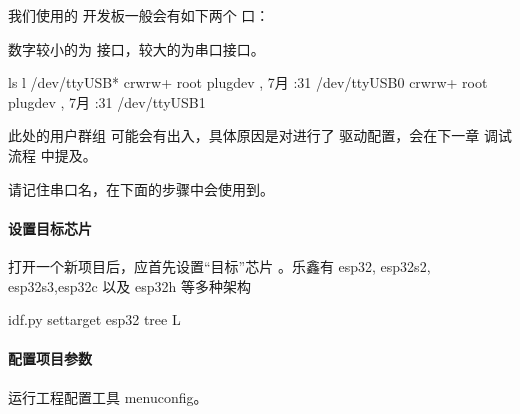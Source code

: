 \documentclass[a4paper,12pt,english]{sphinxmanual}
\begin{document}
\sphinxAtStartPar
我们使用的 开发板一般会有如下两个  口：

\sphinxAtStartPar
数字较小的为 接口，较大的为串口接口。

\begin{sphinxVerbatim}[commandchars=\\\{\}]
ls \PYGZhy{}l /dev/ttyUSB*
crw\PYGZhy{}rw\PYGZhy{}\PYGZhy{}\PYGZhy{}\PYGZhy{}+  root plugdev ,  7月   :31 /dev/ttyUSB0
crw\PYGZhy{}rw\PYGZhy{}\PYGZhy{}\PYGZhy{}\PYGZhy{}+  root plugdev ,  7月   :31 /dev/ttyUSB1
\end{sphinxVerbatim}

\sphinxAtStartPar
此处的用户群组 可能会有出入，具体原因是对进行了 驱动配置，会在下一章 调试流程 中提及。

\sphinxAtStartPar
请记住串口名，在下面的步骤中会使用到。


\paragraph{设置目标芯片}
\label{\detokenize{exp-esp32/ide/esp-idf-clion-dev:id7}}
\sphinxAtStartPar
打开一个新项目后，应首先设置“目标”芯片 。乐鑫有 esp32, esp32\sphinxhyphen{}s2, esp32\sphinxhyphen{}s3,esp32\sphinxhyphen{}c 以及 esp32\sphinxhyphen{}h 等多种架构

\begin{sphinxVerbatim}[commandchars=\\\{\}]
idf.py set\PYGZhy{}target esp32
tree \PYGZhy{}L 
\end{sphinxVerbatim}


\paragraph{配置项目参数}
\label{\detokenize{exp-esp32/ide/esp-idf-clion-dev:id8}}
\sphinxAtStartPar
运行工程配置工具 menuconfig。

\begin{sphinxVerbatim}[commandchars=\\\{\}]
 
\end{sphinxVerbatim}
\end{document}
